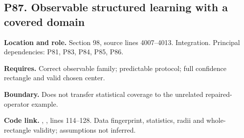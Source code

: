 \documentclass[11pt,letterpaper]{article}
\begin{document}
\par\noindent\begin{minipage}{\textwidth}
\subsection{P87. Observable structured learning with a covered
domain}\label{p87.-observable-structured-learning-with-a-covered-domain}

\textbf{Location and role.} Section 98, source lines 4007--4013.
Integration. Principal dependencies: P81, P83, P84, P85, P86.

\textbf{Requires.} Correct observable family; predictable protocol; full
confidence rectangle and valid chosen center.

\textbf{Boundary.} Does not transfer statistical coverage to the
unrelated repaired-operator example.

\textbf{Code link.} ,
, lines 114--128. Data fingerprint,
statistics, radii and whole-rectangle validity; assumptions not
inferred.
\end{minipage}\par\medskip
\end{document}
